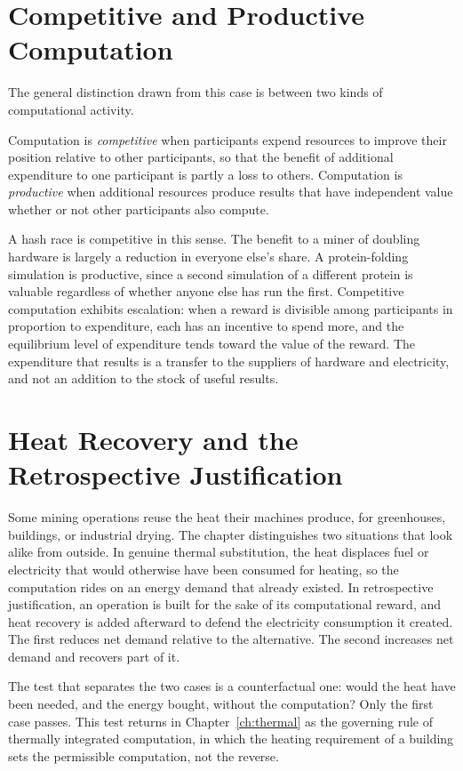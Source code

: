 \section{Competitive and Productive Computation}

The general distinction drawn from this case is between two kinds of computational activity.

\begin{definition}
\label{def:competitive}
Computation is \emph{competitive} when participants expend resources to improve their position relative to other participants, so that the benefit of additional expenditure to one participant is partly a loss to others. Computation is \emph{productive} when additional resources produce results that have independent value whether or not other participants also compute.
\end{definition}

A hash race is competitive in this sense. The benefit to a miner of doubling hardware is largely a reduction in everyone else's share. A protein-folding simulation is productive, since a second simulation of a different protein is valuable regardless of whether anyone else has run the first. Competitive computation exhibits escalation: when a reward is divisible among participants in proportion to expenditure, each has an incentive to spend more, and the equilibrium level of expenditure tends toward the value of the reward. The expenditure that results is a transfer to the suppliers of hardware and electricity, and not an addition to the stock of useful results.

\section{Heat Recovery and the Retrospective Justification}

Some mining operations reuse the heat their machines produce, for greenhouses, buildings, or industrial drying. The chapter distinguishes two situations that look alike from outside. In genuine thermal substitution, the heat displaces fuel or electricity that would otherwise have been consumed for heating, so the computation rides on an energy demand that already existed. In retrospective justification, an operation is built for the sake of its computational reward, and heat recovery is added afterward to defend the electricity consumption it created. The first reduces net demand relative to the alternative. The second increases net demand and recovers part of it.

The test that separates the two cases is a counterfactual one: would the heat have been needed, and the energy bought, without the computation? Only the first case passes. This test returns in Chapter~\ref{ch:thermal} as the governing rule of thermally integrated computation, in which the heating requirement of a building sets the permissible computation, not the reverse.
